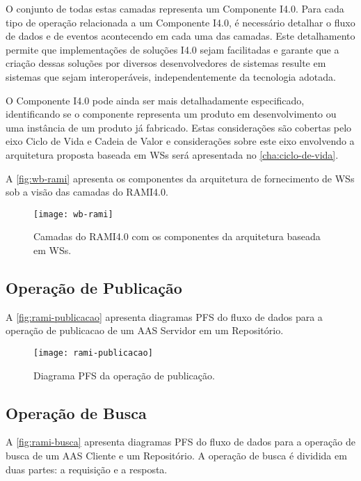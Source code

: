 	O conjunto de todas estas camadas representa um Componente I4.0. Para cada tipo de operação relacionada a um Componente I4.0, é necessário detalhar o fluxo de dados e de eventos acontecendo em cada uma das camadas. Este detalhamento permite que implementações de soluções I4.0 sejam facilitadas e garante que a criação dessas soluções por diversos desenvolvedores de sistemas resulte em sistemas que sejam interoperáveis, independentemente da tecnologia adotada.
	
	O Componente I4.0 pode ainda ser mais detalhadamente especificado, identificando se o componente representa um produto em desenvolvimento ou uma instância de um produto já fabricado. Estas considerações são cobertas pelo eixo Ciclo de Vida e Cadeia de Valor e considerações sobre este eixo envolvendo a arquitetura proposta baseada em WSs será apresentada no \autoref{cha:ciclo-de-vida}.
	
	A \autoref{fig:wb-rami} apresenta os componentes da arquitetura de fornecimento de WSs sob a visão das camadas do RAMI4.0. 
	
	\begin{figure}[H]
		\centering
		\caption{Camadas do RAMI4.0 com os componentes da arquitetura baseada em WSs.}
		\label{fig:wb-rami}
		\texttt{[image: wb-rami]}
	\end{figure}

\subsection{ Operação de Publicação }

	A \autoref{fig:rami-publicacao} apresenta diagramas PFS do fluxo de dados para a operação de publicacao de um AAS Servidor em um Repositório.
	
	\begin{figure}[htb]
		\centering
		\caption{Diagrama PFS da operação de publicação.}
		\label{fig:rami-publicacao}
		\texttt{[image: rami-publicacao]}
	\end{figure}
	

\newpage
\subsection{ Operação de Busca }

	A \autoref{fig:rami-busca} apresenta diagramas PFS do fluxo de dados para a operação de busca de um AAS Cliente e um Repositório. A operação de busca é dividida em duas partes: a requisição e a resposta.
	
